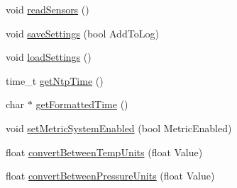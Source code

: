 \begin{DoxyCompactItemize}
\item 
void \mbox{\hyperlink{_gbox420_8ino_ad40ccf803c2eff76d7e0e7a24c9937ef}{read\+Sensors}} ()
\item 
void \mbox{\hyperlink{_gbox420_8ino_a4f17eb8b1a9b3bdb588e9d7ae4b93710}{save\+Settings}} (bool Add\+To\+Log)
\item 
void \mbox{\hyperlink{_gbox420_8ino_a1165e1d4439a045e94970c9fbc73bb3c}{load\+Settings}} ()
\item 
time\+\_\+t \mbox{\hyperlink{_gbox420_8ino_a42ab384e77148282f4730ec6c68ac2a3}{get\+Ntp\+Time}} ()
\item 
char $\ast$ \mbox{\hyperlink{_gbox420_8ino_a1ebe4ccb96ff35ce0b74c4afc0c597fe}{get\+Formatted\+Time}} ()
\item 
void \mbox{\hyperlink{_gbox420_8ino_a0a334a3bfc5a85501fdba63a77747000}{set\+Metric\+System\+Enabled}} (bool Metric\+Enabled)
\item 
float \mbox{\hyperlink{_gbox420_8ino_ac3c5e4580e7b7eb984177631c03466e1}{convert\+Between\+Temp\+Units}} (float Value)
\item 
float \mbox{\hyperlink{_gbox420_8ino_af5faad5ff5382f6d56651869e8736809}{convert\+Between\+Pressure\+Units}} (float Value)
\end{DoxyCompactItemize}
